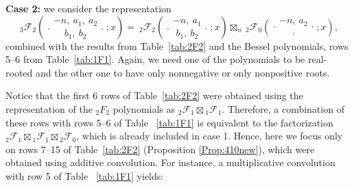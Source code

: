 \documentclass[reqno,11pt]{amsart}
\theoremstyle{remark}
\newcommand{\FF}{\mathcal{F}}
\newcommand*\pFq[5]{%
 {\ }_{#1}{\mathcal F}_{#2}{\left(\genfrac..{0pt}{}{#3}{#4};#5\right)}%
}
\begin{document}
\medskip

\textbf{Case 2:}  we consider the representation 
\begin{equation} \label{3F2Real2}
    \pFq{3}{2}{-n,\ a_1,\ a_2}{b_1,\ b_2}{x}=\pFq{2}{2}{-n,\ a_1}{b_1, \ b_2}{x} \boxtimes_n \pFq{2}{0}{-n,\ a_2}{\cdot }{x},
\end{equation}
combined with the results from Table~\ref{tab:2F2} and the Bessel polynomials, rows 5--6 from Table~\ref{tab:1F1}. Again, we need one of the polynomials to be real-rooted and the other one to have only nonnegative or only nonpositive roots.

Notice that the first 6 rows of Table~\ref{tab:2F2} were obtained using the representation of the ${}_2 F_2$ polynomials as ${}_2 \FF_1\boxtimes {}_1 \FF_1 $. Therefore, a combination of these rows with rows 5--6 of Table ~\ref{tab:1F1} is equivalent to the factorization ${}_2 \FF_1\boxtimes {}_1 \FF_1 \boxtimes {}_2 \FF_0$, which is already included in case 1. Hence, here we focus only on rows 7--15 of Table~\ref{tab:2F2} (Proposition \ref{Prop:410new}), which were obtained using additive convolution. For instance, a multiplicative convolution with row 5 of Table ~\ref{tab:1F1} yields:
\end{document}
